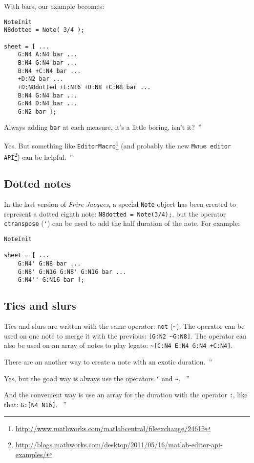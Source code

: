 \documentclass{article}
\newcommand{\matlab}{\textsc{Matlab}\xspace}
\newcommand{\note}{\lstinline!Note!\xspace}
\newcommand{\frerejaques}{\emph{Fr\`ere Jacques}\xspace}
\newcommand{\exchange}[2]{\texttt{#1}\footnote{\url{#2}}\xspace}
\newenvironment{meenv}{ \par \noindent \makebox[6em][r]{ \textcolor{mecolor}{Me}: `` --~}}{~''}
\newenvironment{myselfenv}{ \par \noindent \makebox[6em][r]{ \textcolor{myselfcolor}{Myself}: `` --~}}{~''}
\newcommand{\me}[1]{\begin{meenv}#1\end{meenv}}
\newcommand{\myself}[1]{\begin{myselfenv}#1\end{myselfenv}}
\begin{document}
With bars, our example becomes:
\begin{lstlisting}
NoteInit
N8dotted = Note( 3/4 );

sheet = [ ...
	G:N4 A:N4 bar ...
	B:N4 G:N4 bar ...
	B:N4 +C:N4 bar ...
	+D:N2 bar ...
	+D:N8dotted +E:N16 +D:N8 +C:N8 bar ...
	B:N4 G:N4 bar ...
	G:N4 D:N4 bar ...
	G:N2 bar ];
\end{lstlisting}

\me{Always adding \lstinline!bar! at each measure, it's a little boring, isn't it?}
\myself{Yes. But something like \exchange{EditorMacro}{http://www.mathworks.com/matlabcentral/fileexchange/24615} (and probably the new \exchange{\matlab editor API}{http://blogs.mathworks.com/desktop/2011/05/16/matlab-editor-api-examples/}) can be helpful.}

\subsection{Dotted notes}
\label{sec:TutoDottedNotes}

In the last version of \frerejaques, a special \note object has been created to represent a dotted eighth note: \lstinline!N8dotted = Note(3/4);!, but the operator \lstinline!ctranspose! (\lstinline!'!) can be used to add the half duration of the note. For example: \\

\begin{lstlisting}
NoteInit

sheet = [ ...
	G:N4' G:N8 bar ...
	G:N8' G:N16 G:N8' G:N16 bar ...
	G:N4'' G:N16 bar ];
\end{lstlisting}

\subsection{Ties and slurs}

Ties and slurs are written with the same operator: \lstinline!not! (\lstinline!~!). The operator can be used on one note to merge it with the previous: \lstinline![G:N2 ~G:N8]!. The operator can also be used on an array of notes to play legato: \lstinline!~[C:N4 E:N4 G:N4 +C:N4]!.

\me{There are an another way to create a note with an exotic duration.}
\begin{myselfenv}%
	Yes, but the good way is always use the operators \lstinline!'! and \lstinline!~!.%
\end{myselfenv}
\begin{meenv}%
	And the convenient way is use an array for the duration with the operator \lstinline!:!, like that: \lstinline!G:[N4 N16]!.%
\end{meenv}
\end{document}

